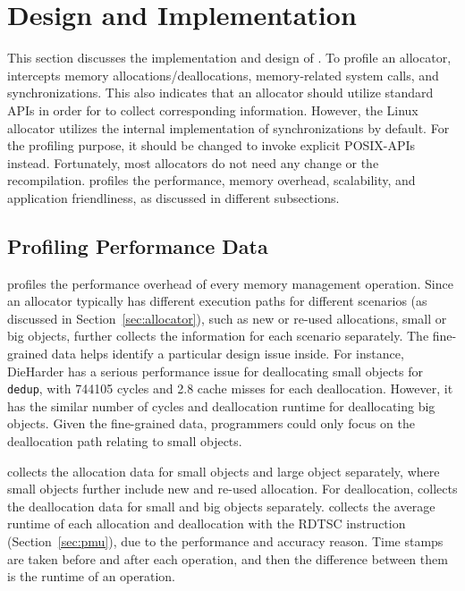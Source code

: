 \section{Design and Implementation}
\label{sec:implementation}

This section discusses the implementation and design of \MP{}. To profile an allocator, \MP{} intercepts memory allocations/deallocations, memory-related system calls, and synchronizations. This also indicates that an allocator should utilize standard APIs in order for \MP{} to collect corresponding information. However, the Linux allocator utilizes the internal implementation of synchronizations by default. For the profiling purpose, it should be changed to invoke explicit POSIX-APIs instead. Fortunately, most allocators do not need any change or the recompilation.  \MP{} profiles the performance, memory overhead, scalability, and application friendliness, as discussed in different subsections. 


\subsection{Profiling Performance Data}

\label{sec:performanceimplement}

\MP{} profiles the performance overhead of every memory management operation. Since an allocator typically has different execution paths for different scenarios (as discussed in Section~\ref{sec:allocator}), such as new or re-used allocations, small or big objects, \MP{} further collects the information for each scenario separately. The fine-grained data helps identify a particular design issue inside. For instance, DieHarder has a serious performance issue for deallocating small objects for \texttt{dedup}, with 744105 cycles and 2.8 cache misses for each deallocation. However, it has the similar number of cycles and deallocation runtime  for deallocating big objects. Given the fine-grained data, programmers could only focus on the deallocation path relating to small objects.

\MP{} collects the allocation data for small objects and large object separately, where small objects further include new and re-used allocation. For deallocation, \MP{} collects the deallocation data for small and big objects separately. \MP{} collects the average runtime of each allocation and deallocation with the RDTSC instruction (Section~\ref{sec:pmu}), due to the performance and accuracy reason. Time stamps are taken before and after each operation, and then the difference between them is the runtime of an operation. 

